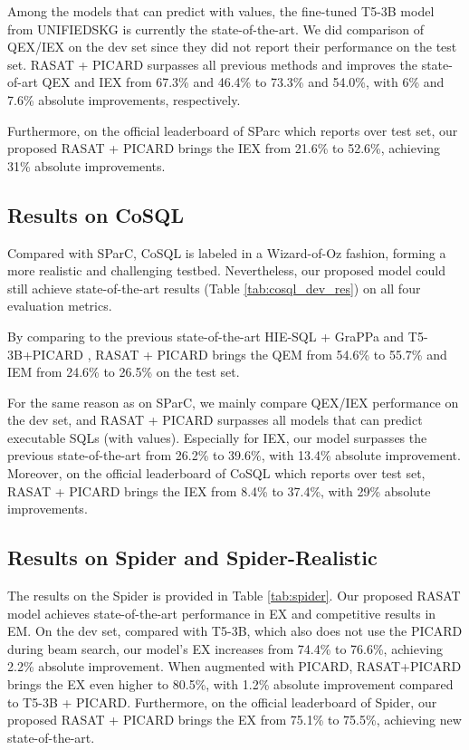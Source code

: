 \documentclass[11pt]{article}
\begin{document}
Among the models that can predict with values, the fine-tuned T5-3B model from UNIFIEDSKG \citep{xie2022unifiedskg} is currently the state-of-the-art. We did comparison of QEX/IEX on the dev set since they did not report their performance on the test set.
RASAT + PICARD surpasses all previous methods and improves the state-of-art QEX and IEX from 67.3\% and 46.4\% to 73.3\% and 54.0\%, with 6\% and 7.6\% absolute improvements, respectively. 

Furthermore, on the official leaderboard of SParc which reports over test set, our proposed RASAT + PICARD brings the IEX from 21.6\% to 52.6\%, achieving 31\% absolute improvements.





\subsection{Results on CoSQL}
Compared with SParC, CoSQL is labeled in a Wizard-of-Oz fashion, forming a more realistic and challenging testbed. Nevertheless, our proposed model could still achieve state-of-the-art results (Table \ref{tab:cosql_dev_res}) on all four evaluation metrics.








By comparing to the previous state-of-the-art HIE-SQL + GraPPa \citep{zheng2022hie} and T5-3B+PICARD \cite{scholak-etal-2021-picard}, RASAT + PICARD brings the QEM from 54.6\% to 55.7\% and IEM from 24.6\% to 26.5\% on the test set.  

For the same reason as on SParC, we mainly compare QEX/IEX performance on the dev set, and RASAT + PICARD surpasses all models that can predict executable SQLs (with values). Especially for IEX, our model surpasses the previous state-of-the-art from 26.2\% to 39.6\%, with 13.4\%  absolute improvement. 
Moreover, on the official leaderboard of CoSQL which reports over test set, RASAT + PICARD brings the IEX from 8.4\% to 37.4\%, with 29\% absolute improvements.




\subsection{Results on Spider and Spider-Realistic}
The results on the Spider is provided in Table \ref{tab:spider}. Our proposed RASAT model achieves state-of-the-art performance in EX and competitive results in EM. 
On the dev set, compared with T5-3B, which also does not use the PICARD during beam search, our model's EX increases from 74.4\% to 76.6\%, achieving 2.2\% absolute improvement. When augmented with PICARD, RASAT+PICARD brings the EX even higher to 80.5\%, with 1.2\% absolute improvement compared to T5-3B + PICARD. 
Furthermore, on the official leaderboard of Spider, our proposed RASAT + PICARD brings the EX from 75.1\% to 75.5\%, achieving new state-of-the-art.
\end{document}
